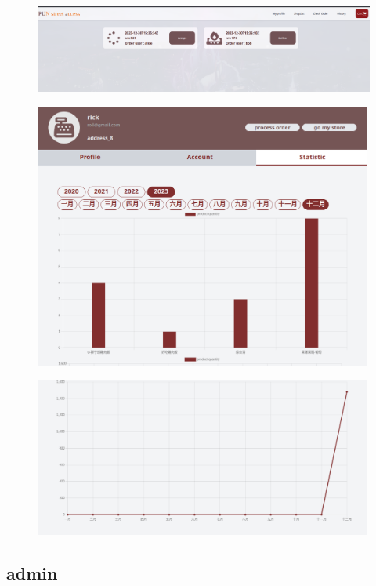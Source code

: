 \documentclass[a4paper, 12pt]{article}
\begin{document}
\newline
{}
\begin{figure}[hp]
    \centerline{\includegraphics[width=40em]{gui-snapshot/seller/order-status.png}}
    \label{fig:enter-label}
\end{figure}
\newpage
{}
\begin{figure}[hp]
    \centerline{\includegraphics[width=30em]{gui-snapshot/seller/statistic.png}}
    \label{fig:enter-label}
\end{figure}
\begin{figure}[hp]
    \centerline{\includegraphics[width=30em]{gui-snapshot/seller/statistic-1.png}}
    \label{fig:enter-label}
\end{figure}
\newpage

\subsection{admin}
\end{document}
